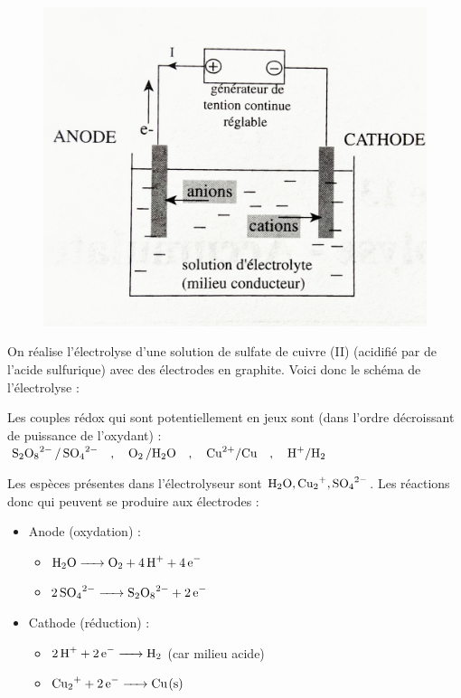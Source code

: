 \documentclass[11pt,a4paper]{article}
\begin{document}
\begin{eg}

\begin{figure}
\centering
\includegraphics[width=0.95\linewidth]{imgs/c6/exosulfate.jpg}
\end{figure}

On réalise l'électrolyse d'une solution de sulfate de cuivre (II) (acidifié par de l'acide sulfurique) avec des électrodes en graphite. Voici donc le schéma de l'électrolyse : 

Les couples rédox qui sont potentiellement en jeux sont (dans l'ordre décroissant de puissance de l'oxydant) : $\ce{S2O8^2- / SO4^2-} \quad , \quad \ce{O2 /H2O}\quad , \quad  \ce{Cu^2+/Cu}\quad , \quad \ce{H+/H2} $

Les espèces présentes dans l'électrolyseur sont $\ce{H2O }, \ce{Cu2+}, \ce{SO4^2-}$. Les réactions donc qui peuvent se produire aux électrodes : 
\begin{multicols}{2}
\begin{itemize}
    \item Anode (oxydation) : 
    \begin{itemize}
        \item $\ce{H2O -> O2 + 4H+ + 4e-} $
        \item $\ce{2SO4^2- -> S2O8^2- + 2e-} $
    \end{itemize}
    \item Cathode (réduction) :
    \begin{itemize}
        \item $\ce{2H+ + 2e- -> H2}  $ (car milieu acide)
        \item $ \ce{Cu2+ + 2e- -> Cu_(s)}$    \end{itemize}
\end{itemize}
\end{multicols}


\end{eg}
\end{document}

